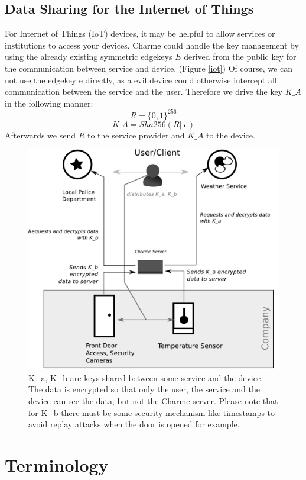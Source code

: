 \documentclass{scrartcl}
\begin{document}
  \subsection{Data Sharing for the Internet of Things}
  For Internet of Things (IoT) devices, it may be helpful to allow services or institutions to access your devices. Charme could handle the key management by using the already existing symmetric edgekeys $E$  derived from the public key for the communication between service and device. (Figure \ref{iot})
Of course, we can not use the edgekey e directly, as a evil device could 
otherwise intercept all communication between the service and the user.
Therefore we drive the key $K\_A$ in the following manner:
$$
R = {\lbrace0,1\rbrace}^{256}
$$
$$
K\_A = Sha256(R || e)
$$
Afterwards we send $R$ to the service provider and $K\_A $ to the device.
\begin{figure}[ht]
	\centering
  \includegraphics[width=120mm]{illustrations/iot.pdf}
	\caption{K\_a, K\_b are keys shared between some service and the device. The data is encrypted so that only the user, the service and the device can see the data, but not the Charme server. Please note that for K\_b there must be some security mechanism  like timestamps to avoid replay attacks when the door is opened for example. \label{iot} }
	\label{figContext}
\end{figure}


\clearpage
\section{Terminology}
\end{document}
